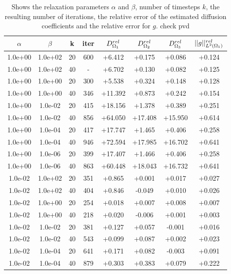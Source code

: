 \documentclass[11pt,a4paper]{article}
\begin{document}
\begin{table}
\centering
\caption{ Shows the relaxation parameters $\alpha$ and $\beta$, number of timesteps $k$, the resulting number of iterations, the relative error of the estimated diffusion coefficients and the relative error for $g$. {\color{red} check pvd }}
\begin{tabular}{*{8}c}
$\alpha$ & $\beta$ & k & iter & $ D_{\Omega_1}\sp{rel}$& $D_{\Omega_2}\sp{rel} $ & $D_{\Omega_3}\sp{rel} $&$|| g ||\sp{rel}_{L\sp{2}(\Omega_1)} $ \\
\hline
 1.0e+00 	 & 1.0e+02 	 & 20 & 600 	 & +6.412 & +0.175 & +0.086 & +0.124 \\
 1.0e+00 	 & 1.0e+02 	 & 40 &  -   & +6.702 & +0.130 & +0.082 & +0.125 \\  
 1.0e+00 	 & 1.0e+00 	 & 20 & 300 	 & +5.538 & +0.324 & +0.148 & +0.128 \\ 
 1.0e+00 	 & 1.0e+00 	 & 40 & 346 	 & +11.392 & +0.873 & +0.242 & +0.154 \\ 
 1.0e+00 	 & 1.0e-02 	 & 20 & 415 	 & +18.156 & +1.378  & +0.389  & +0.251 \\ 
 1.0e+00 	 & 1.0e-02 	 & 40 & 856 	 & +64.050 & +17.408 & +15.950 & +0.614 \\ 
 1.0e+00 	 & 1.0e-04 	 & 20 & 417 	 & +17.747 & +1.465  & +0.406  & +0.258 \\ 
 1.0e+00 	 & 1.0e-04 	 & 40 & 946 	 & +72.594 & +17.985 & +16.702 & +0.641 \\
 1.0e+00 	 & 1.0e-06 	 & 20 & 399 	 & +17.407 & +1.466  & +0.406  & +0.258 \\ 
 1.0e+00 	 & 1.0e-06 	 & 40 & 863 	 & +60.448 & +18.043 & +16.732 & +0.641 \\
 \hline
 1.0e-02 	 & 1.0e+02 	 & 20 & 351 	 & +0.865 & +0.001 & +0.017 & +0.027 \\ 
 1.0e-02 	 & 1.0e+02 	 & 40 & 404 	 & +0.846 & -0.049 & +0.010 & +0.026 \\ 
 1.0e-02 	 & 1.0e+00 	 & 20 & 254 	 & +0.018 & +0.007 & +0.008 & +0.007 \\ 
 1.0e-02 	 & 1.0e+00 	 & 40 & 218 	 & +0.020 & -0.006 & +0.001 & +0.003 \\ 
 1.0e-02 	 & 1.0e-02 	 & 20 & 381 	 & +0.127 & +0.057 & -0.001 & +0.016 \\ 
 1.0e-02 	 & 1.0e-02 	 & 40 & 543 	 & +0.099 & +0.087 & +0.002 & +0.023 \\
 1.0e-02 	 & 1.0e-04 	 & 20 & 641 	 & +0.171 & +0.082 & -0.003 & +0.091 \\ 
 1.0e-02 	 & 1.0e-04 	 & 40 & 879 	 & +0.303 & +0.383 & +0.079 & +0.222 \\ 

\end{tabular}
\end{table}
\end{document}
